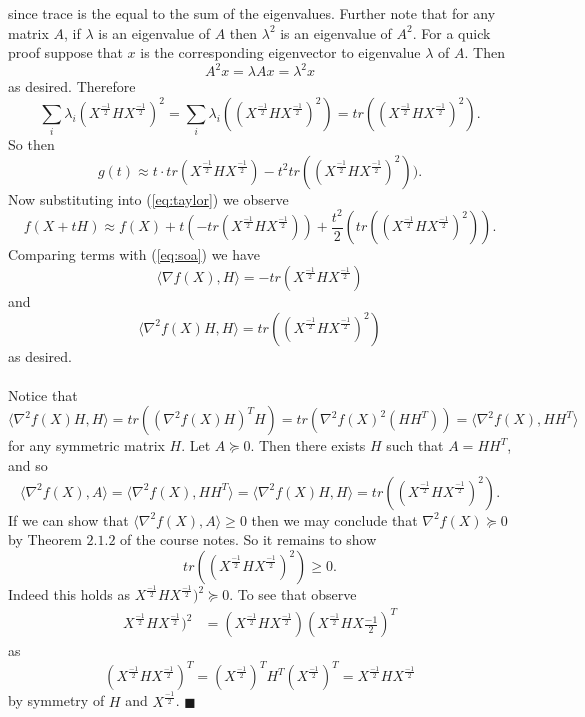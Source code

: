 \documentclass[letterpaper,12pt,oneside,onecolumn]{article}
\newcommand{\1}{\mathbbm{1}}
\begin{document}
since trace is the equal to the sum of the eigenvalues. Further note that for any matrix $A$, if $\lambda$ is an eigenvalue of $A$ then $\lambda^2$ is an eigenvalue of $A^2$. For a quick proof suppose that $x$ is the corresponding eigenvector to eigenvalue $\lambda$ of $A$. Then
$$A^2x = \lambda Ax = \lambda^2x$$
as desired. Therefore
$$\sum_{i} \lambda_i(X^\frac{-1}{2}HX^\frac{-1}{2})^2 = \sum_{i} \lambda_i((X^\frac{-1}{2}HX^\frac{-1}{2})^2) = tr((X^\frac{-1}{2}HX^\frac{-1}{2})^2).$$
So then
$$g(t) \approx t\cdot tr(X^\frac{-1}{2}HX^\frac{-1}{2}) - t^2 tr((X^\frac{-1}{2}HX^\frac{-1}{2})^2)).$$
Now substituting into (\ref{eq:taylor}) we observe
$$f(X+tH) \approx f(X) + t(-tr(X^\frac{-1}{2}HX^\frac{-1}{2})) + \frac{t^2}{2}(tr((X^\frac{-1}{2}HX^\frac{-1}{2})^2)).$$
Comparing terms with (\ref{eq:soa}) we have
$$\langle \nabla f(X), H \rangle = -tr(X^\frac{-1}{2}HX^\frac{-1}{2})$$
and
$$\langle \nabla^2f(X)H, H\rangle = tr((X^\frac{-1}{2}HX^\frac{-1}{2})^2)$$
as desired.
\paragraph{}
Notice that
$$\langle \nabla^2f(X)H, H\rangle = tr((\nabla^2f(X)H)^TH) = tr(\nabla^2f(X)^2(HH^T)) = \langle \nabla^2f(X), HH^T\rangle$$
for any symmetric matrix $H$.
Let $A \succcurlyeq 0$. Then there exists $H$ such that $A = HH^T$, and so
$$\langle\nabla^2f(X), A \rangle = \langle \nabla^2f(X), HH^T\rangle = \langle \nabla^2f(X)H, H\rangle = tr((X^\frac{-1}{2}HX^\frac{-1}{2})^2).$$
If we can show that $\langle\nabla^2f(X), A \rangle \geq 0$ then we may conclude that $\nabla^2f(X) \succcurlyeq 0$ by Theorem $2.1.2$ of the course notes. So it remains to show
$$tr((X^\frac{-1}{2}HX^\frac{-1}{2})^2) \geq 0.$$
Indeed this holds as $X^\frac{-1}{2}HX^\frac{-1}{2})^2 \succcurlyeq 0$. To see that observe
\begin{align*}
X^\frac{-1}{2}HX^\frac{-1}{2})^2 &= (X^\frac{-1}{2}HX^\frac{-1}{2})(X^\frac{-1}{2}HX\frac{-1}{2})^T
\end{align*}
as $$(X^\frac{-1}{2}HX^\frac{-1}{2})^T = (X^\frac{-1}{2})^TH^T(X^\frac{-1}{2})^T = X^\frac{-1}{2}HX^\frac{-1}{2}$$
by symmetry of $H$ and $X^\frac{-1}{2}$. $\blacksquare$
\end{document}
